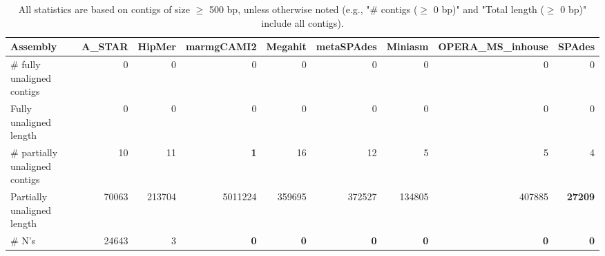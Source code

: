 \documentclass[12pt,a4paper]{article}
\begin{document}
\begin{table}[ht]
\begin{center}
\caption{All statistics are based on contigs of size $\geq$ 500 bp, unless otherwise noted (e.g., "\# contigs ($\geq$ 0 bp)" and "Total length ($\geq$ 0 bp)" include all contigs).}
\begin{tabular}{|l*{8}{|r}|}
\hline
Assembly & A\_STAR & HipMer & marmgCAMI2 & Megahit & metaSPAdes & Miniasm & OPERA\_MS\_inhouse & SPAdes \\ \hline
\# fully unaligned contigs & 0 & 0 & 0 & 0 & 0 & 0 & 0 & 0 \\ \hline
Fully unaligned length & 0 & 0 & 0 & 0 & 0 & 0 & 0 & 0 \\ \hline
\# partially unaligned contigs & 10 & 11 & {\bf 1} & 16 & 12 & 5 & 5 & 4 \\ \hline
Partially unaligned length & 70063 & 213704 & 5011224 & 359695 & 372527 & 134805 & 407885 & {\bf 27209} \\ \hline
\# N's & 24643 & 3 & {\bf 0} & {\bf 0} & {\bf 0} & {\bf 0} & {\bf 0} & {\bf 0} \\ \hline
\end{tabular}
\end{center}
\end{table}
\end{document}
